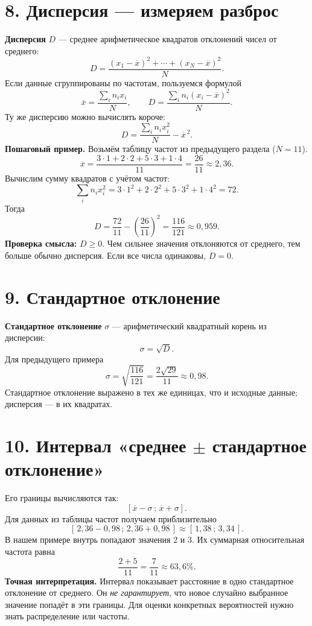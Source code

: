 \documentclass[a4paper,12pt]{article}
\newcommand{\key}[1]{\textcolor{darkaccent}{\textbf{#1}}}
\newcommand{\mysection}[1]{\vspace{5pt}\section*{\textcolor{darkaccent}{#1}}\vspace{-5pt}}
\newcommand{\xbar}{\overline{x}}
\begin{document}
\mysection{8. Дисперсия --- измеряем разброс}
\key{Дисперсия} $D$ --- среднее арифметическое квадратов отклонений чисел от среднего:
\[
\boxed{\displaystyle D=\frac{(x_1-\xbar)^2+\cdots+(x_N-\xbar)^2}{N}.}
\]
Если данные сгруппированы по частотам, пользуемся формулой
\[
\boxed{\displaystyle \xbar=\frac{\sum_i n_ix_i}{N},\qquad D=\frac{\sum_i n_i(x_i-\xbar)^2}{N}.}
\]
Ту же дисперсию можно вычислять короче:
\[
\boxed{\displaystyle D=\frac{\sum_i n_ix_i^2}{N}-\xbar^{\,2}.}
\]
\textbf{Пошаговый пример.} Возьмём таблицу частот из предыдущего раздела ($N=11$).
\[
\xbar=\frac{3\cdot1+2\cdot2+5\cdot3+1\cdot4}{11}=\frac{26}{11}\approx2{,}36.
\]
Вычислим сумму квадратов с учётом частот:
\[
\sum_i n_ix_i^2=3\cdot1^2+2\cdot2^2+5\cdot3^2+1\cdot4^2=72.
\]
Тогда
\[
D=\frac{72}{11}-\left(\frac{26}{11}\right)^2
=\frac{116}{121}\approx0{,}959.
\]
\key{Проверка смысла:} $D\ge0$. Чем сильнее значения отклоняются от среднего, тем больше обычно дисперсия. Если все числа одинаковы, $D=0$.

\mysection{9. Стандартное отклонение}
\key{Стандартное отклонение} $\sigma$ --- арифметический квадратный корень из дисперсии:
\[
\boxed{\displaystyle \sigma=\sqrt{D}.}
\]
Для предыдущего примера
\[
\sigma=\sqrt{\frac{116}{121}}=\frac{2\sqrt{29}}{11}\approx0{,}98.
\]
Стандартное отклонение выражено в тех же единицах, что и исходные данные; дисперсия --- в их квадратах.

\clearpage
\mysection{10. Интервал «среднее $\pm$ стандартное отклонение»}
Его границы вычисляются так:
\[
\boxed{[\xbar-\sigma\,;\,\xbar+\sigma].}
\]
Для данных из таблицы частот получаем приблизительно
\[
[\,2{,}36-0{,}98\,;\,2{,}36+0{,}98\,]
\approx [\,1{,}38\,;\,3{,}34\,].
\]
В нашем примере внутрь попадают значения $2$ и $3$. Их суммарная относительная частота равна
\[
\frac{2+5}{11}=\frac7{11}\approx63{,}6\%.
\]
\textbf{Точная интерпретация.} Интервал показывает расстояние в одно стандартное отклонение от среднего. Он \emph{не гарантирует}, что новое случайно выбранное значение попадёт в эти границы. Для оценки конкретных вероятностей нужно знать распределение или частоты.
\end{document}
